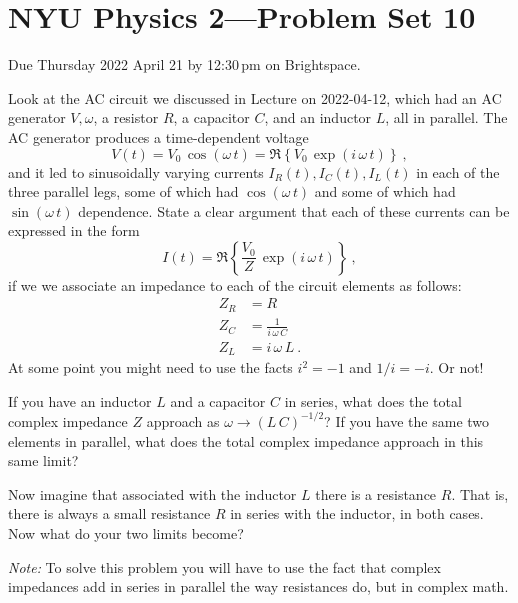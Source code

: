 \documentclass[12pt]{article}
\begin{document}
\section*{NYU Physics 2---Problem Set 10}

Due Thursday 2022 April 21 by 12:30\,pm on Brightspace.

\startproblem%
Look at the AC circuit we discussed in Lecture on
2022-04-12, which had an AC generator $V,\omega$, a resistor $R$,
a capacitor $C$, and an inductor $L$, all in parallel.
The AC generator produces a time-dependent voltage
\begin{equation}
  V(t) = V_0\,\cos(\omega\,t) = \Re\left\{V_0\,\exp(i\,\omega\,t)\right\} ~,
\end{equation}
and it led to sinusoidally varying currents $I_R(t), I_C(t), I_L(t)$ in each of the three
parallel legs, some of which had $\cos(\omega\,t)$ and some of which had
$\sin(\omega\,t)$ dependence.
State a clear argument that each of these currents can be expressed in the
form
\begin{equation}
  I(t) = \Re\left\{\frac{V_0}{Z}\,\exp(i\,\omega\,t)\right\} ~,
\end{equation}
if we we associate an impedance to each of the circuit elements as follows:
\begin{align}
  Z_R &= R \\
  Z_C &= \frac{1}{i\,\omega\,C} \\
  Z_L &= i\,\omega\,L ~.
\end{align}
At some point you might need to use the facts $i^2 = -1$ and $1/i = -i$. Or not!

\startproblem%
If you have an inductor $L$ and a capacitor $C$ in series, what does
the total complex impedance $Z$ approach as $\omega\rightarrow
(L\,C)^{-1/2}$? If you have the same two elements in parallel, what
does the total complex impedance approach in this same limit?

Now imagine that associated with the inductor $L$ there is a
resistance $R$. That is, there is always a small resistance $R$ in
series with the inductor, in both cases. Now what do your two limits
become?

\textsl{Note:} To solve this problem you will have to use the fact that
complex impedances add in series in parallel the way resistances do, but
in complex math.

\end{document}
